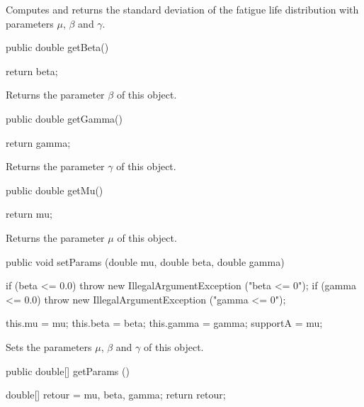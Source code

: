 \begin{tabb}  Computes and returns the standard deviation
   of the fatigue life distribution
   with parameters $\mu$, $\beta$ and $\gamma$.
\end{tabb}
\begin{htmlonly}
\end{htmlonly}
\begin{code}

   public double getBeta()\begin{hide} {
      return beta;
   }\end{hide}
\end{code}
 \begin{tabb} Returns the parameter $\beta$ of this object.
 \end{tabb}
\begin{code}

   public double getGamma()\begin{hide} {
      return gamma;
   }\end{hide}
\end{code}
 \begin{tabb} Returns the parameter $\gamma$ of this object.
 \end{tabb}
\begin{code}

   public double getMu()\begin{hide} {
      return mu;
   }\end{hide}
\end{code}
 \begin{tabb} Returns the parameter $\mu$ of this object.
 \end{tabb}
\begin{code}

   public void setParams (double mu, double beta, double gamma)\begin{hide} {
      if (beta <= 0.0)
         throw new IllegalArgumentException ("beta <= 0");
      if (gamma <= 0.0)
         throw new IllegalArgumentException ("gamma <= 0");
      
      this.mu = mu;
      this.beta = beta;
      this.gamma = gamma;
      supportA = mu;
   }\end{hide}
\end{code}
\begin{tabb}
   Sets the parameters $\mu$, $\beta$ and $\gamma$ of this object.
\end{tabb}
\begin{code}

   public double[] getParams ()\begin{hide} {
      double[] retour = {mu, beta, gamma};
      return retour;
   }\end{hide}
\end{code}

